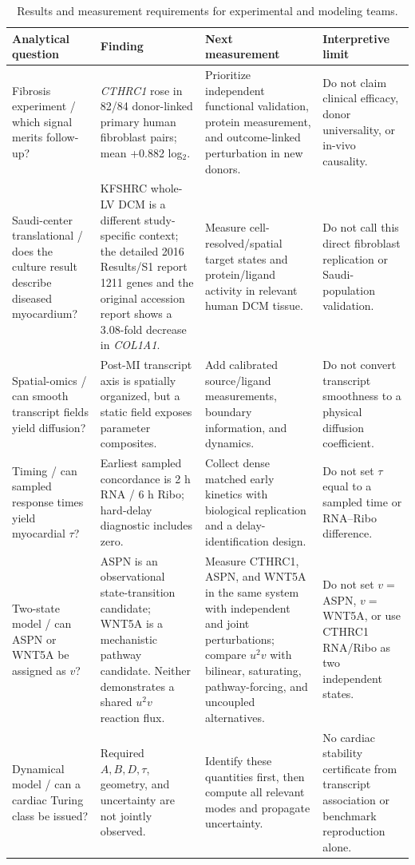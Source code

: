 \documentclass[preprint,11pt]{elsarticle}
\newcommand{\cthrc}{\textit{CTHRC1}}
\begin{document}
\begin{table}[!htbp]
\centering
\caption{Results and measurement requirements for experimental and modeling teams.}
\label{tab:actions}
\scriptsize
\begin{tabularx}{\linewidth}{>{\RaggedRight\arraybackslash}p{2.7cm}YYY}
\toprule
\textbf{Analytical question} & \textbf{Finding} & \textbf{Next measurement} & \textbf{Interpretive limit}\\
\midrule
Fibrosis experiment / which signal merits follow-up? & \cthrc{} rose in 82/84 donor-linked primary human fibroblast pairs; mean +0.882 log$_2$. & Prioritize independent functional validation, protein measurement, and outcome-linked perturbation in new donors. & Do not claim clinical efficacy, donor universality, or in-vivo causality.\\
Saudi-center translational / does the culture result describe diseased myocardium? & KFSHRC whole-LV DCM is a different study-specific context; the detailed 2016 Results/S1 report 1211 genes and the original accession report shows a 3.08-fold decrease in \textit{COL1A1}. & Measure cell-resolved/spatial target states and protein/ligand activity in relevant human DCM tissue. & Do not call this direct fibroblast replication or Saudi-population validation.\\
Spatial-omics / can smooth transcript fields yield diffusion? & Post-MI transcript axis is spatially organized, but a static field exposes parameter composites. & Add calibrated source/ligand measurements, boundary information, and dynamics. & Do not convert transcript smoothness to a physical diffusion coefficient.\\
Timing / can sampled response times yield myocardial $\tau$? & Earliest sampled concordance is 2 h RNA / 6 h Ribo; hard-delay diagnostic includes zero. & Collect dense matched early kinetics with biological replication and a delay-identification design. & Do not set $\tau$ equal to a sampled time or RNA--Ribo difference.\\
Two-state model / can ASPN or WNT5A be assigned as $v$? & ASPN is an observational state-transition candidate; WNT5A is a mechanistic pathway candidate. Neither demonstrates a shared $u^2v$ reaction flux. & Measure CTHRC1, ASPN, and WNT5A in the same system with independent and joint perturbations; compare $u^2v$ with bilinear, saturating, pathway-forcing, and uncoupled alternatives. & Do not set $v=$ASPN, $v=$WNT5A, or use CTHRC1 RNA/Ribo as two independent states.\\
Dynamical model / can a cardiac Turing class be issued? & Required $A,B,D,\tau$, geometry, and uncertainty are not jointly observed. & Identify these quantities first, then compute all relevant modes and propagate uncertainty. & No cardiac stability certificate from transcript association or benchmark reproduction alone.\\
\bottomrule
\end{tabularx}
\end{table}
\end{document}
